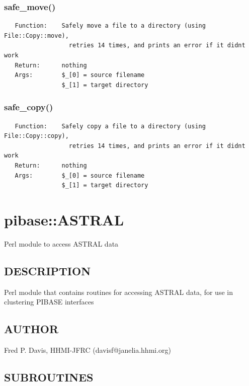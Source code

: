 \documentclass{article}
\begin{document}
\subsubsection*{safe\_move()\label{pibase_pm_safe_move_}}
\begin{verbatim}
   Function:    Safely move a file to a directory (using File::Copy::move),
                  retries 14 times, and prints an error if it didnt work
   Return:      nothing
   Args:        $_[0] = source filename
                $_[1] = target directory
\end{verbatim}
\subsubsection*{safe\_copy()\label{pibase_pm_safe_copy_}}
\begin{verbatim}
   Function:    Safely copy a file to a directory (using File::Copy::copy),
                  retries 14 times, and prints an error if it didnt work
   Return:      nothing
   Args:        $_[0] = source filename
                $_[1] = target directory
\end{verbatim}
\clearpage
\section{pibase::ASTRAL\label{pibase::ASTRAL}}


Perl module to access ASTRAL data

\subsection*{DESCRIPTION\label{pibase::ASTRAL_DESCRIPTION}}


Perl module that contains routines for accessing ASTRAL data, for
use in clustering PIBASE interfaces

\subsection*{AUTHOR\label{pibase::ASTRAL_AUTHOR}}


Fred P. Davis, HHMI-JFRC (davisf@janelia.hhmi.org)

\subsection*{SUBROUTINES\label{pibase::ASTRAL_SUBROUTINES}}
\end{document}
